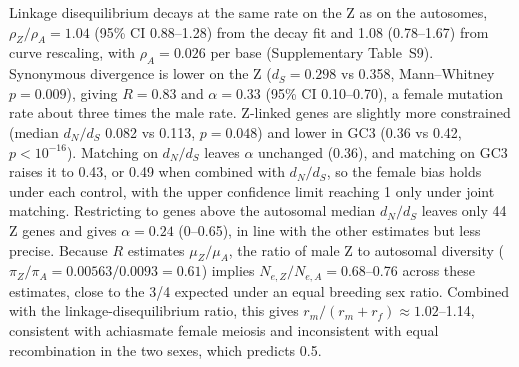 \documentclass[11pt]{article}
\begin{document}
Linkage disequilibrium decays at the same rate on the Z as on the autosomes, $\rho_Z/\rho_A=1.04$ (95\% CI
0.88--1.28) from the decay fit and 1.08 (0.78--1.67) from curve rescaling, with $\rho_A=0.026$ per base
(Supplementary Table~S9). Synonymous divergence is lower on the Z ($d_S=0.298$ vs 0.358, Mann--Whitney $p=0.009$),
giving $R=0.83$ and $\alpha=0.33$ (95\% CI 0.10--0.70), a female mutation rate about three times the male rate.
Z-linked genes are slightly more constrained (median $d_N/d_S$ 0.082 vs 0.113, $p=0.048$) and lower in GC3 (0.36
vs 0.42, $p<10^{-16}$). Matching on $d_N/d_S$ leaves $\alpha$ unchanged (0.36), and matching on GC3 raises it to
0.43, or 0.49 when combined with $d_N/d_S$, so the female bias holds under each control, with the upper
confidence limit reaching 1 only under joint matching. Restricting to genes above the autosomal median $d_N/d_S$ leaves only 44 Z genes and gives $\alpha=0.24$ (0--0.65), in line with the other estimates but less precise. Because $R$ estimates $\mu_Z/\mu_A$, the ratio of male Z
to autosomal diversity ($\pi_Z/\pi_A=0.00563/0.0093=0.61$) implies $N_{e,Z}/N_{e,A}=0.68$--0.76 across these
estimates, close to the 3/4 expected under an equal breeding sex ratio. Combined with the
linkage-disequilibrium ratio, this gives $r_m/(r_m+r_f)\approx1.02$--1.14, consistent with achiasmate female
meiosis \citep{coffing2026} and inconsistent with equal recombination in the two sexes, which predicts 0.5.
\end{document}
